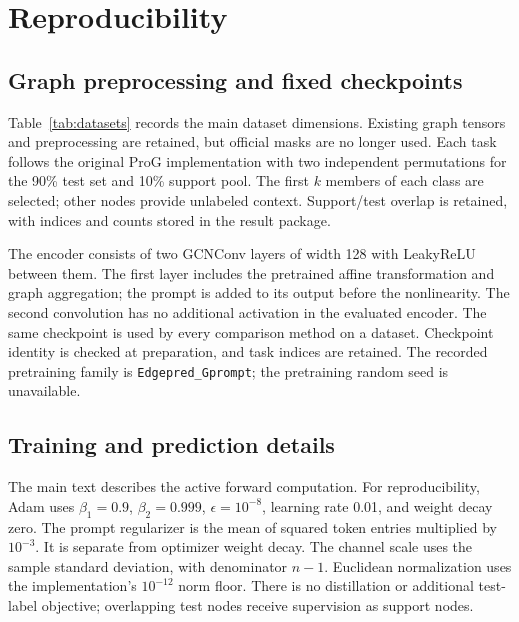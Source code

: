 \section{Reproducibility}
\label{app:protocol}
\subsection{Graph preprocessing and fixed checkpoints}
Table~\ref{tab:datasets} records the main dataset dimensions. Existing graph tensors and preprocessing are retained, but official masks are no longer used. Each task follows the original ProG implementation with two independent permutations for the 90\% test set and 10\% support pool. The first $k$ members of each class are selected; other nodes provide unlabeled context. Support/test overlap is retained, with indices and counts stored in the result package.


The encoder consists of two GCNConv layers of width 128 with LeakyReLU between them. The first layer includes the pretrained affine transformation and graph aggregation; the prompt is added to its output before the nonlinearity. The second convolution has no additional activation in the evaluated encoder. The same checkpoint is used by every comparison method on a dataset. Checkpoint identity is checked at preparation, and task indices are retained. The recorded pretraining family is \texttt{Edgepred\_Gprompt}; the pretraining random seed is unavailable.

\subsection{Training and prediction details}
The main text describes the active forward computation. For reproducibility, Adam uses $\beta_1=0.9$, $\beta_2=0.999$, $\epsilon=10^{-8}$, learning rate 0.01, and weight decay zero. The prompt regularizer is the mean of squared token entries multiplied by $10^{-3}$. It is separate from optimizer weight decay. The channel scale uses the sample standard deviation, with denominator $n-1$. Euclidean normalization uses the implementation's $10^{-12}$ norm floor. There is no distillation or additional test-label objective; overlapping test nodes receive supervision as support nodes.

